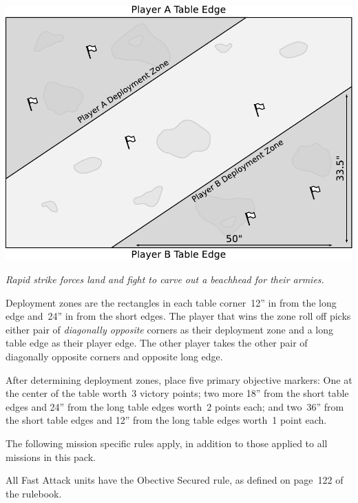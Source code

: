 \documentclass{40k}
\begin{document}

\bigskip\centerline{\includegraphics[scale=0.6]{maps/mission3}}


\clearpage
{}

\centerline{\emph{Rapid strike forces land and fight to carve out a
    beachhead for their armies.}}


Deployment zones are the rectangles in each table corner~12'' in from
the long edge and~24'' in from the short edges.  The player that wins
the zone roll off picks either pair of \emph{diagonally opposite}
corners as their deployment zone and a long table edge as their player
edge.  The other player takes the other pair of diagonally opposite
corners and opposite long edge.

\bigskip%
After determining deployment zones, place five primary objective
markers: One at the center of the table worth~3 victory points; two
more 18'' from the short table edges and 24'' from the long table
edges worth~2 points each; and two~36'' from the short table edges and
12'' from the long table edges worth~1 point each.


The following mission specific rules apply, in addition to those
applied to all missions in this pack.

  All Fast Attack units have the
Obective Secured rule, as defined on page~122 of the rulebook.
\end{document}
